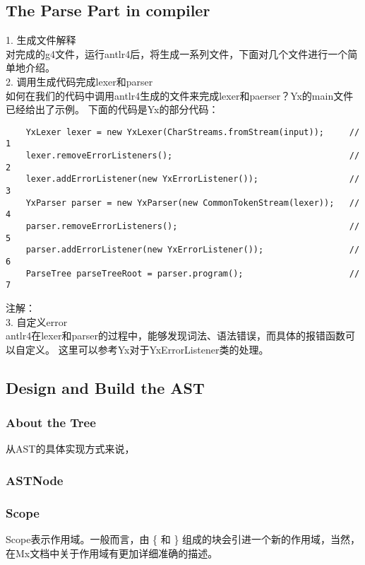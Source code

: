 \subsection{The Parse Part in compiler}
1. 生成文件解释 \\
对完成的g4文件，运行antlr4后，将生成一系列文件，下面对几个文件进行一个简单地介绍。 \\


2. 调用生成代码完成lexer和parser \\
如何在我们的代码中调用antlr4生成的文件来完成lexer和paerser？Yx的main文件已经给出了示例。
下面的代码是Yx的部分代码：\\
\begin{verbatim}
    YxLexer lexer = new YxLexer(CharStreams.fromStream(input));     // 1
    lexer.removeErrorListeners();                                   // 2
    lexer.addErrorListener(new YxErrorListener());                  // 3    
    YxParser parser = new YxParser(new CommonTokenStream(lexer));   // 4
    parser.removeErrorListeners();                                  // 5
    parser.addErrorListener(new YxErrorListener());                 // 6
    ParseTree parseTreeRoot = parser.program();                     // 7
\end{verbatim}
注解： \\


3. 自定义error \\
antlr4在lexer和parser的过程中，能够发现词法、语法错误，而具体的报错函数可以自定义。
这里可以参考Yx对于YxErrorListener类的处理。

\subsection{Design and Build the AST}
\subsubsection{About the Tree}
从AST的具体实现方式来说，

\subsubsection{ASTNode}

\subsubsection{Scope}
Scope表示作用域。一般而言，由 \{ 和 \} 组成的块会引进一个新的作用域，当然，在Mx文档中关于作用域有更加详细准确的描述。\\

